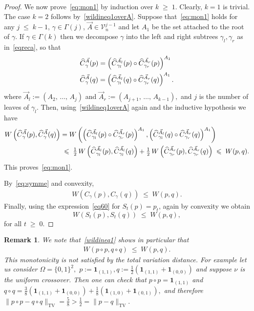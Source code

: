 \documentclass[10pt,a4paper]{article}
\newtheorem{rema}[theorem]{Remark}
\renewcommand{\leq}{\;\leqslant\;}
\renewcommand{\geq}{\;\geqslant\;}
\newcommand{\Om}{\Omega}
\newcommand{\tv}{\mathrm{TV}}
\newcommand{\IND}{\mathbf{1}}
\newcommand{\cV}{\mathcal{V}}
\let\g=\gamma
\let\G=\Gamma
\let\oldhat\hat
\renewcommand*{\hat}[1]{\mathchoice{\widehat{#1}}{\widehat{#1}}{\oldhat{#1}}{\oldhat{#1}}}
\begin{document}
\begin{proof}
We now prove~\eqref{eq:mon1} by induction over $k\geq 1$. Clearly, $k=1$ is trivial. The case $k=2$ follows by~\eqref{wildineq1overA}. Suppose that~\eqref{eq:mon1} holds for any $j\leq k-1$, $\g\in\G(j)$, $\vec A\in \cV_n^{j-1}$ and let $A_1$ be the set attached to the root of $\gamma$. If $\gamma \in \Gamma(k)$ then we decompose $\g$ into the left and right subtrees $\g_l,\g_r$ as in~\eqref{eqreca}, so that
\begin{align*}
& \hat{C}^{\vec A}_{\gamma}(p) = \left(\hat{C}^{\vec{A}_{l}}_{\gamma_l}(p)\circ \hat{C}^{\vec{A}_{r}}_{\gamma_r}(p)\right)^{A_1} \\
&\hat{C}^{\vec A}_{\gamma}(q) = \left(\hat{C}^{\vec{A}_{l}}_{\gamma_l}(q)\circ \hat{C}^{\vec{A}_{r}}_{\gamma_r}(q)\right)^{A_1}.
\end{align*}
where $\vec{A}_{l} :=(A_2,\,\dots,\,A_j)$ and $\vec{A}_{r} :=(A_{j+1},\,\dots,\,A_{k-1}),$ and $j$ is the number of leaves of $\g_l.$ Then, using~\eqref{wildineq1overA} again and the inductive hypothesis we have
\begin{align*}
W\left(\hat{C}^{\vec A}_{\gamma}(p),\hat{C}^{\vec A}_{\gamma}(q)\right) &= W\left(\left(\hat{C}^{\vec{A}_{l}}_{\gamma_l}(p)\circ \hat{C}^{\vec{A}_{r}}_{\gamma_r}(p)\right)^{A_1},\left(\hat{C}^{\vec{A}_{l}}_{\gamma_l}(q)\circ \hat{C}^{\vec{A}_{r}}_{\gamma_r}(q)\right)^{A_1}\right) \\
& \leq \tfrac{1}{2}\,W\left(\hat{C}^{\vec{A}_{l}}_{\gamma_l}(p),\hat{C}^{\vec{A}_{l}}_{\gamma_l}(q)\right) + \tfrac{1}{2}\,W\left(\hat{C}^{\vec{A}_{r}}_{\gamma_r}(p), \hat{C}^{\vec{A}_{r}}_{\gamma_r}(q)\right)
\leq W(p,q).
\end{align*}
This proves~\eqref{eq:mon1}.

By~\eqref{eq:symme} and convexity,
\begin{align}\label{wildineq3}
W(C_{\gamma}(p),C_{\gamma}(q))\leq W(p,q).
\end{align}
Finally, using the expression~\eqref{eq60} for $S_t(p)=p_t$, again by convexity we obtain
\[
W(S_t(p),S_t(q))\leq W(p,q),
\]
for all $t\geq 0$.
\end{proof}



\begin{rema}\label{rem:mono}
We note that~\eqref{wildineq1} shows in particular that
\begin{align}\label{wildineq21}
W\left(p\circ p,q\circ q\right) \leq W\left(p,q\right).
\end{align}
This monotonicity is not satisfied by the total variation distance. For example let us consider $\Om=\{0,1\}^2,$ $p:=\IND_{(1,1)}, q:=\frac 12(\IND_{(1,1)}+\IND_{(0,0)})$ and suppose $\nu$ is the uniform crossover. Then one can check that $p \circ p = \IND_{(1,1)}$ and $q \circ q = \frac{3}8(\IND_{(1,1)}+\IND_{(0,0)}) + \frac{1}8(\IND_{(1,0)}+\IND_{(0,1)}),$ and therefore $\|p \circ p - q \circ q\|_\tv = \frac 58 > \frac 12 = \|p-q\|_\tv.$
\end{rema}
\end{document}
